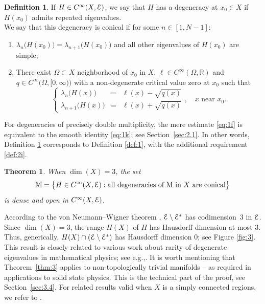 \documentclass[11pt]{article}
\newcommand{\eg}{e.g.,\xspace}
\numberwithin{equation}{section}
\let\pazocal\EuScript
\newenvironment{enumeratei}
{\bgroup\def\theenumi{\roman{enumi}}\def\theenumii{\arabic{enumii}}\begin{enumerate}}
{\end{enumerate}\egroup}
\let\sep:
\newtheorem{theorem}[thm]{Theorem}
\theoremstyle{definition}
\newtheorem{defi}{Definition}
\newcommand{\EE}{\pazocal{E}}
\newcommand{\R}{\mathbb{R}}
\newcommand{\Mm}{\mathbb{M}}
\newcommand{\systeme}[1]{\left\{ \begin{matrix} #1 \end{matrix}\right.}
\begin{document}
\begin{defi}\label{def:2} If $H \in C^\infty(X,\EE)$, we say that $H$ has a degeneracy at $x_0 \in X$ if $H(x_0)$ admits repeated eigenvalues.\\
\indent We say that this degeneracy is conical if for some $n \in [1,N-1]$:
\begin{enumeratei}
\item\label{def:2i}
$\lambda_n\bigl( H(x_0) \bigr) = \lambda_{n+1}\bigl( H(x_0) \bigr)$ and all other eigenvalues of $H(x_0)$ are simple;
\item\label{def:2ii}
There exist $\Omega \subset X$ neighborhood of $x_0$ in $X$, $\ell \in C^\infty(\Omega,\R)$ and $q \in C^\infty\bigl(\Omega,[0,\infty)\bigr)$ with a non-degenerate critical value zero at $x_0$ such that
\begin{equation}\label{eq:1k}
\systeme{
\lambda_n\bigl(H(x)\bigr) & = & \ell(x) - \sqrt{q(x)}
\\[5pt]
\lambda_{n+1}\bigl(H(x)\bigr) & = & \ell(x) + \sqrt{q(x)}}, \quad x \text{ near } x_0.
\end{equation}
\end{enumeratei}
\end{defi}

For degeneracies of precisely double multiplicity, the mere estimate \eqref{eq:1f} is equivalent to the smooth identity \eqref{eq:1k}; see Section~\ref{sec:2.1}. In other words, Definition \ref{def:2} corresponds to Definition \ref{def:1}, with the additional requirement \eqref{def:2i}.

\begin{theorem}\label{thm:2} When $\dim(X) = 3$, the set
\begin{equation}\label{eq:1o}
\Mm = \bigl\{ H \in C^\infty(X,\EE) \sep \text{all degeneracies of M in $X$ are conical} \bigr\}
\end{equation}
is dense and open in $C^\infty(X,\EE)$.
\end{theorem}

According to the von Neumann--Wigner theorem \cite{NW29}, $\EE \setminus \EE^*$ has codimension~$3$ in $\EE$. Since $\dim(X) = 3$, the range $H(X)$ of $H$ has Hausdorff dimension at most $3$. Thus, generically, $H(X) \cap \left( \EE \setminus \EE^*\right)$ has Hausdorff dimension $0$; see Figure \ref{fig:3}. This result is closely related to various work about rarity of degenerate eigenvalues in mathematical physics; see \eg \cite{C91,A95,T99}.
It is worth mentioning that Theorem~\ref{thm:3} applies to non-topologically trivial manifolds -- as required in applications to solid state physics. This is the technical part of the proof, see Section~\ref{sec:3.4}. For related results valid when $X$ is a simply connected regions, we refer to \cite[\S4]{DP12}.
\end{document}

